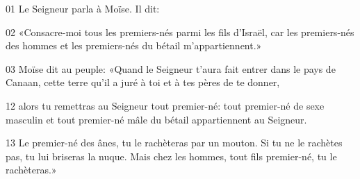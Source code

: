 01 Le Seigneur parla à Moïse. Il dit:

02 «Consacre-moi tous les premiers-nés parmi les fils d’Israël, car les premiers-nés des hommes et les premiers-nés du bétail m’appartiennent.»

03 Moïse dit au peuple: «Quand le Seigneur t’aura fait entrer dans le pays de Canaan, cette terre qu’il a juré à toi et à tes pères de te donner,

12 alors tu remettras au Seigneur tout premier-né: tout premier-né de sexe masculin et tout premier-né mâle du bétail appartiennent au Seigneur.

13 Le premier-né des ânes, tu le rachèteras par un mouton. Si tu ne le rachètes pas, tu lui briseras la nuque. Mais chez les hommes, tout fils premier-né, tu le rachèteras.»